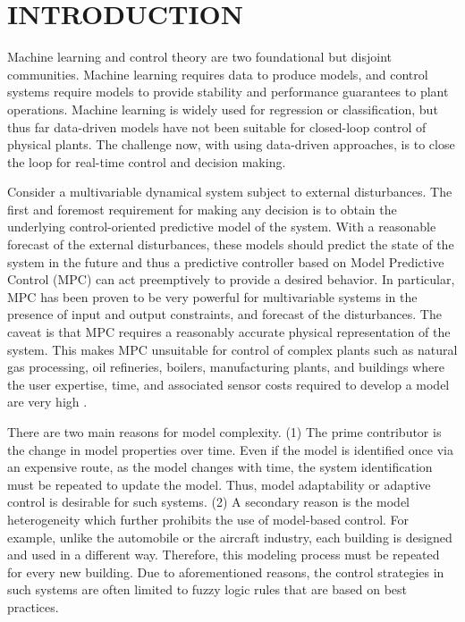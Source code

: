 \section{INTRODUCTION}
\label{S:intro}

Machine learning and control theory are two foundational but disjoint communities. Machine learning requires data to produce models, and control systems require models to provide stability and performance guarantees to plant operations. Machine learning is widely used for regression or classification, but thus far data-driven models have not been suitable for closed-loop control of physical plants. The challenge now, with using data-driven approaches, is to close the loop for real-time control and decision making.

Consider a multivariable dynamical system subject to external disturbances. The first and foremost requirement for making any decision is to obtain the underlying control-oriented predictive model of the system. With a reasonable forecast of the external disturbances, these models should predict the state of the system in the future and thus a predictive controller based on Model Predictive Control (MPC) can act preemptively to provide a desired behavior. In particular, MPC has been proven to be very powerful for multivariable systems in the presence of input and output constraints, and forecast of the disturbances. The caveat is that MPC requires a reasonably accurate physical representation of the system. This makes MPC unsuitable for control of complex plants such as natural gas processing, oil refineries, boilers, manufacturing plants, and buildings where the user expertise, time, and associated sensor costs required to develop a model are very high \cite{Sturzenegger2016,vzavcekova2014}.

There are two main reasons for model complexity. 
(1) The prime contributor is the change in model properties over time. Even if the model is identified once via an expensive route, as the model changes with time, the system identification must be repeated to update the model. Thus, model adaptability or adaptive control is desirable for such systems. 
(2) A secondary reason is the model heterogeneity which further prohibits the use of model-based control. For example, unlike the automobile or the aircraft industry, each building is designed and used in a different way. Therefore, this modeling process must be repeated for every new building. 
Due to aforementioned reasons, the control strategies in such systems are often limited to fuzzy logic rules that are based on best practices. 


